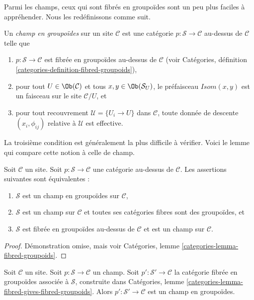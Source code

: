 \noindent
Parmi les champs, ceux qui sont fibrés en groupoïdes sont un peu plus faciles
à appréhender. Nous les redéfinissons comme suit.

\begin{definition}
\label{definition-stack-in-groupoids}
Un {\it champ en groupoïdes} sur un site $\mathcal{C}$ est une
catégorie $p : \mathcal{S} \to \mathcal{C}$ au-dessus de $\mathcal{C}$
telle que
\begin{enumerate}
\item $p : \mathcal{S} \to \mathcal{C}$ est fibrée
en groupoïdes au-dessus de $\mathcal{C}$ (voir
Catégories, définition \ref{categories-definition-fibred-groupoids}),
\item pour tout $U \in \Ob(\mathcal{C})$ et
tous $x, y\in \Ob(\mathcal{S}_U)$, le préfaisceau
$\mathit{Isom}(x, y)$ est un faisceau sur le site $\mathcal{C}/U$, et
\item pour tout recouvrement $\mathcal{U} = \{U_i \to U\}$ dans $\mathcal{C}$,
toute donnée de descente $(x_i, \phi_{ij})$ relative à $\mathcal{U}$ est effective.
\end{enumerate}
\end{definition}

\noindent
La troisième condition est généralement la plus difficile à vérifier.
Voici le lemme qui compare cette notion à celle de champ.

\begin{lemma}
\label{lemma-stack-in-groupoids-stack}
Soit $\mathcal{C}$ un site.
Soit $p : \mathcal{S} \to \mathcal{C}$ une catégorie au-dessus de $\mathcal{C}$.
Les assertions suivantes sont équivalentes :
\begin{enumerate}
\item $\mathcal{S}$ est un champ en groupoïdes sur $\mathcal{C}$,
\item $\mathcal{S}$ est un champ sur $\mathcal{C}$ et toutes ses
catégories fibres sont des groupoïdes, et
\item $\mathcal{S}$ est fibrée en groupoïdes au-dessus de $\mathcal{C}$
et est un champ sur $\mathcal{C}$.
\end{enumerate}
\end{lemma}

\begin{proof}
Démonstration omise, mais voir Catégories, lemme \ref{categories-lemma-fibred-groupoids}.
\end{proof}

\begin{lemma}
\label{lemma-stack-gives-stack-groupoids}
Soit $\mathcal{C}$ un site.
Soit $p : \mathcal{S} \to \mathcal{C}$ un champ.
Soit $p' : \mathcal{S}' \to \mathcal{C}$
la catégorie fibrée en groupoïdes associée à $\mathcal{S}$,
construite dans
Catégories, lemme \ref{categories-lemma-fibred-gives-fibred-groupoids}.
Alors $p' : \mathcal{S}' \to \mathcal{C}$ est un champ en groupoïdes.
\end{lemma}

